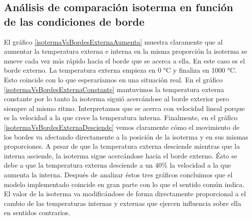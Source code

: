 \subsection{Análisis de comparación isoterma en función de las condiciones de borde}

El gráfico \ref{isotermaVsBordesExternaAumenta} muestra claramente que al aumentar la temperatura externa e interna en la misma proporción la isoterma se mueve cada vez más rápido hacia el borde que se acerca a ella. En este caso es el borde externo. La temperatura externa empieza en 0 °C y finaliza en 1000 °C. Esto coincide con lo que esperaríamos en una situación real.
En el gráfico \ref{isotermaVsBordesExternaConstante} mantuvimos la temperatura externa constante por lo tanto la isoterma siguió acercándose al borde exterior pero siempre al mismo ritmo. Interpretamos que se acerca con velocidad lineal porque es la velocidad a la que crece la temperatura interna.
Finalmente, en el gráfico \ref{isotermaVsBordesExternaDesciende} vemos claramente cómo el movimiento de los bordes va afectando directamente a la posición de la isoterma y en sus mismas proporciones. A pesar de que la temperatura externa desciende mientras que la interna asciende, la isoterma sigue acercándose hacia el borde externo. Ésto se debe a que la temperatura externa desciende a un $40\%$ la velocidad a la que aumenta la interna.
Después de analizar éstos tres gráficos concluimos que el modelo implementado coincide en gran parte con lo que el sentido común indica. El valor de la isoterma va modificándose de forma directamente proporcional a el cambio de las temperaturas internas y externas que ejercen influencia sobre ella en sentidos contrarios.